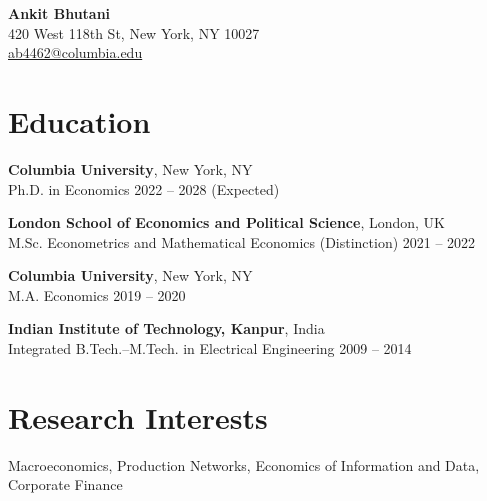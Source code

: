 \documentclass[11pt]{article}
\begin{document}
\begin{center}
    {\LARGE \textbf{Ankit Bhutani}} \\
    420 West 118th St, New York, NY 10027 \\
    \href{mailto:ab4462@columbia.edu}{ab4462@columbia.edu}
\end{center}

\vspace{0.5em}

\section*{Education}

\textbf{Columbia University}, New York, NY \\
Ph.D. in Economics \hfill 2022 -- 2028 (Expected)

\textbf{London School of Economics and Political Science}, London, UK \\
M.Sc. Econometrics and Mathematical Economics (Distinction) \hfill 2021 -- 2022

\textbf{Columbia University}, New York, NY \\
M.A. Economics \hfill 2019 -- 2020

\textbf{Indian Institute of Technology, Kanpur}, India \\
Integrated B.Tech.–M.Tech. in Electrical Engineering \hfill 2009 -- 2014

\section*{Research Interests}

Macroeconomics, Production Networks, Economics of Information and Data, Corporate Finance

\end{document}
